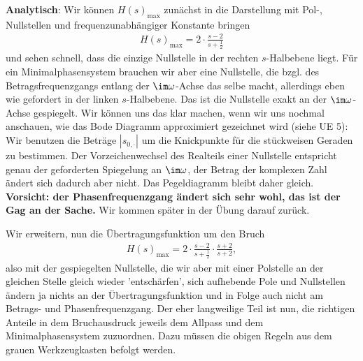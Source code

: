 \begin{ExCalc}
\textbf{Analytisch}:
Wir können $H(s)_\mathrm{max} $ zunächst in die Darstellung mit
Pol-, Nullstellen und frequenzunabhängiger Konstante bringen
\begin{align}
H(s)_\mathrm{max} = 2\cdot\frac{s-2}{s+\frac{1}{2}}
\end{align}
und sehen schnell, dass die einzige Nullstelle in der rechten $s$-Halbebene liegt.
Für ein Minimalphasensystem brauchen wir aber eine Nullstelle, die bzgl. des
Betragsfrequenzgangs entlang der $\im\omega$-Achse das selbe macht, allerdings
eben wie gefordert in der linken $s$-Halbebene.
Das ist die Nullstelle exakt an der $\im\omega$-Achse gespiegelt.
Wir können uns das klar machen, wenn wir uns nochmal anschauen, wie das Bode
Diagramm approximiert gezeichnet wird (siehe UE 5):
Wir benutzen die Beträge $|s_{0,\cdot}|$ um die Knickpunkte für
die stückweisen Geraden zu bestimmen.
Der Vorzeichenwechsel des Realteils einer Nullstelle entspricht genau der
geforderten Spiegelung an $\im\omega$, der Betrag der komplexen Zahl ändert
sich dadurch aber nicht. Das Pegeldiagramm bleibt daher gleich. \textbf{Vorsicht: der
Phasenfrequenzgang ändert sich sehr wohl, das ist der Gag an der Sache.} Wir kommen
später in der Übung darauf zurück.

Wir erweitern,
nun die Übertragungsfunktion um den Bruch
\begin{align}
H(s)_\mathrm{max} = 2\cdot\frac{s-2}{s+\frac{1}{2}} \cdot \frac{s+2}{s+2},
\end{align}
also mit der gespiegelten Nullstelle, die wir aber mit einer Polstelle
an der gleichen Stelle gleich wieder 'entschärfen', sich aufhebende Pole und Nullstellen
ändern ja nichts an der Übertragungsfunktion und in Folge auch nicht am Betrags-
und Phasenfrequenzgang.
Der eher langweilige Teil ist nun, die richtigen Anteile in dem Bruchausdruck
jeweils dem Allpass und dem Minimalphasensystem zuzuordnen.
Dazu müssen die obigen Regeln aus dem grauen Werkzeugkasten befolgt werden.


\end{ExCalc}
